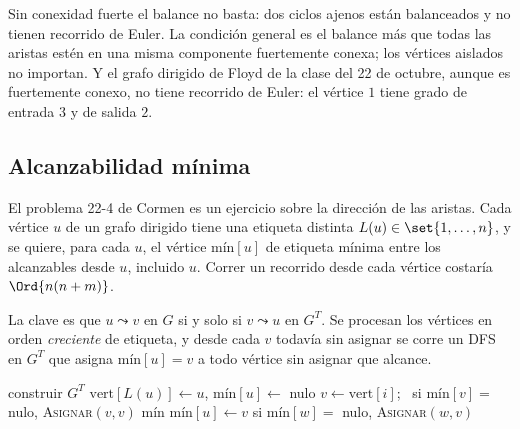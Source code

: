 \documentclass[11pt,letterpaper]{article}
\begin{document}
\begin{ojo}
  Sin conexidad fuerte el balance no basta: dos ciclos ajenos están
  balanceados y no tienen recorrido de Euler. La condición general es
  el balance más que todas las aristas estén en una misma componente
  fuertemente conexa; los vértices aislados no importan. Y el grafo
  dirigido de Floyd de la clase del 22 de octubre, aunque es
  fuertemente conexo, no tiene recorrido de Euler: el vértice $1$
  tiene grado de entrada $3$ y de salida $2$.
\end{ojo}


\subsection*{Alcanzabilidad mínima}

El problema 22-4 de Cormen es un ejercicio sobre la dirección de las
aristas. Cada vértice $u$ de un grafo dirigido tiene una etiqueta
distinta $L(u) \in \set{1, \dots, n}$, y se quiere, para cada $u$, el
vértice $\text{mín}[u]$ de etiqueta mínima entre los alcanzables desde
$u$, incluido $u$. Correr un recorrido desde cada vértice costaría
$\Ord{n(n + m)}$.

La clave es que $u \leadsto v$ en $G$ si y solo si $v \leadsto u$ en
$G^T$. Se procesan los vértices en orden \emph{creciente} de etiqueta,
y desde cada $v$ todavía sin asignar se corre un DFS en $G^T$ que
asigna $\text{mín}[u] = v$ a todo vértice sin asignar que alcance.

\begin{algorithm}[H]
\caption{\textsc{Mínimos-Alcanzables}$(G, L)$, problema 22-4}
\label{alg:minimos-alcanzables}
\begin{algorithmic}[1]
  \State construir $G^T$
    \State $\text{vert}[L(u)] \gets u$, \quad
           $\text{mín}[u] \gets$ nulo
  \EndFor
    \State $v \gets \text{vert}[i]$; \ si $\text{mín}[v] =$ nulo,
           \textsc{Asignar}$(v, v)$
  \EndFor
  \State \Return $\text{mín}$
\EndProcedure
\Statex
{} 
  \State $\text{mín}[u] \gets v$
    \State si $\text{mín}[w] =$ nulo, \textsc{Asignar}$(w, v)$
  \EndFor
\EndProcedure
\end{algorithmic}
\end{algorithm}
\end{document}

